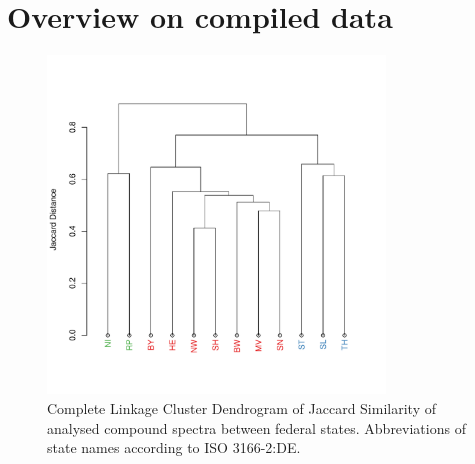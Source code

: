 \documentclass[pdftex,a4paper]{scrreprt}
\begin{document}
\chapter{Overview on compiled data}



\begin{figure}
\centering
\includegraphics[width = 0.8\textwidth]{varclus}
\caption{Complete Linkage Cluster Dendrogram of Jaccard Similarity of analysed compound spectra between federal states. Abbreviations of state names according to ISO 3166-2:DE.}
\label{fig:varclus}
\end{figure}




\end{document}
